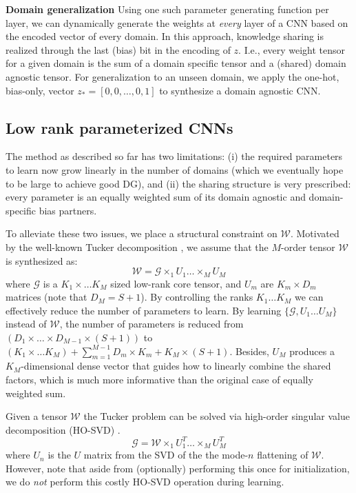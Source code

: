 \documentclass[10pt,twocolumn,letterpaper]{article}
\begin{document}
\vspace{0.1cm}\noindent\textbf{Domain generalization}\quad
Using one such parameter generating function per layer, we can dynamically generate the weights at \emph{every} layer of a CNN based on the encoded vector of every domain. In this approach, knowledge sharing is realized through the last (bias) bit in the encoding of $z$. I.e., every weight tensor for a given domain is the sum of a domain specific tensor and a (shared) domain agnostic tensor. For generalization to an unseen domain, we apply the one-hot, bias-only, vector $z_*=[0,0,\dots,0,1]$ to synthesize a domain agnostic CNN. 

\subsection{Low rank parameterized CNNs}

The method as described so far has two limitations: (i) the required parameters to learn now grow linearly in the number of domains (which we eventually hope to be large to achieve good DG), and (ii) the sharing structure is very prescribed: every parameter is an equally weighted sum of its domain agnostic and domain-specific bias partners. 

To alleviate these two issues, we place a structural constraint on $\mathcal{W}$. Motivated by the well-known Tucker decomposition \cite{Tuck1966c}, we assume that the $M$-order tensor $\mathcal{W}$ is synthesized as:
\begin{equation}
\mathcal{W} = \mathcal{G} \times_1 U_1 \dots \times_M U_M
\end{equation}
\noindent where $\mathcal{G}$ is a $K_1\times \dots K_M$  sized low-rank core tensor, and $U_m$ are $K_m \times D_m$ matrices (note that $D_M = S+1$). By controlling the ranks $K_1\dots K_M$ we can effectively reduce the number of parameters to learn. By learning $\{\mathcal{G},U_1\dots U_M\}$ instead of $\mathcal{W}$, the number of parameters is reduced from $(D_1\times\dots\times  D_{M-1} \times (S+1))$ to $(K_1\times\dots K_M) + \sum_{m=1}^{M-1} D_m\times K_m + K_M\times(S+1)$. Besides, $U_M$ produces a $K_M$-dimensional dense vector that guides how to linearly combine the shared factors, which is much more informative than the original case of equally weighted sum.

Given a tensor $\mathcal{W}$ the Tucker problem can be solved via high-order singular value decomposition (HO-SVD) \cite{Lathauwer2000}. 
\begin{equation}
\mathcal{G} = \mathcal{W}\times_1 U^T_1 \dots \times_M U^T_M\label{eq:svdTucker}
\end{equation}
where $U_n$ is the $U$ matrix from the SVD of the the mode-$n$ flattening of $\mathcal{W}$. However, note that aside from (optionally) performing this once for initialization, we do \emph{not} perform this costly HO-SVD operation during learning. 
\end{document}
